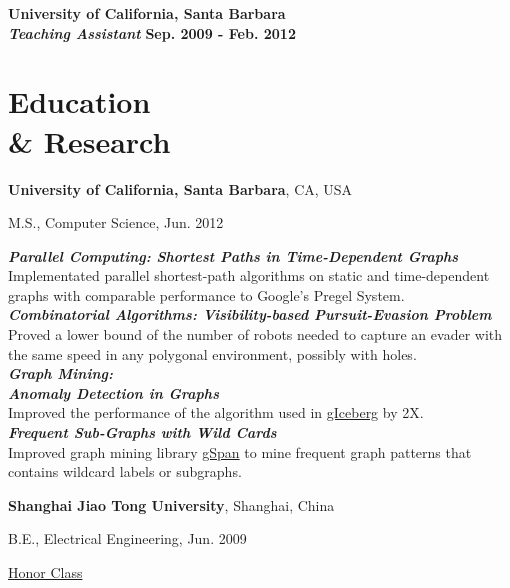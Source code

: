 \documentclass[margin,line]{res}
\newenvironment{list1}{
  \begin{list}{\ding{113}}{%
      \setlength{\itemsep}{0in}
      \setlength{\parsep}{0in} \setlength{\parskip}{0in}
      \setlength{\topsep}{0in} \setlength{\partopsep}{0in}
      \setlength{\leftmargin}{0.17in}}}{\end{list}}
\begin{document}
\begin{resume}
{\bf{University of California, Santa Barbara}}\\
{\bf{\em Teaching Assistant}} \hfill {\bf Sep. 2009 - Feb. 2012}

\section{\sc Education\\\& Research}
{\bf University of California, Santa Barbara}, CA, USA\\
\vspace*{-.1in}
\begin{list1}
\item[] M.S., Computer Science, Jun. 2012
\end{list1}

\vspace*{-.1in}
{\bf{\em Parallel Computing: Shortest Paths in Time-Dependent Graphs}}\\
Implementated parallel shortest-path algorithms on static and time-dependent graphs with comparable performance to Google's Pregel System.\\

\vspace*{-.2in}
{\bf{\em Combinatorial Algorithms: Visibility-based Pursuit-Evasion Problem}}\\
Proved a lower bound of the number of robots needed to capture an evader with the same speed in any polygonal environment, possibly with holes.\\

\vspace*{-.2in}
{\bf{\em Graph Mining:\\\hspace*{.2in}Anomaly Detection in Graphs}}\\
Improved the performance of the algorithm used in \href{https://drive.google.com/open?id=1TMkCJGdvBT6-96O487QWsjsFdTMqDxQT}{gIceberg} by 2X.\\
{\bf{\em \hspace*{.2in}Frequent Sub-Graphs with Wild Cards}}\\
Improved graph mining library \href{https://www.cs.ucsb.edu/~xyan/software/gSpan.htm}{gSpan} to mine frequent graph patterns that contains wildcard labels or subgraphs.

{\bf Shanghai Jiao Tong University}, Shanghai, China\\
\vspace*{-.1in}
\begin{list1}
\item[] B.E., Electrical Engineering, Jun. 2009
\item[] \href{https://drive.google.com/open?id=16OkB9044sx22P3BQwLKHNrZMnmeHmUoZ}{Honor Class}
\end{list1}


\end{resume}
\end{document}
